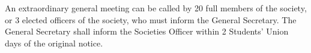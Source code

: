 \begin{clause}
  An extraordinary general meeting can be called by 20 full members of the society, or 3 elected officers of the society, who must inform the General Secretary. The General Secretary shall inform the Societies Officer within 2 Students' Union days of the original notice.
\end{clause}
